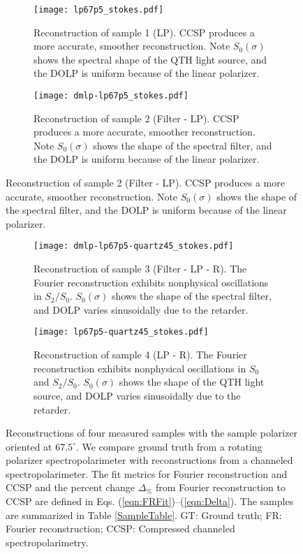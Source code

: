 \documentclass[10pt]{article}
\numberwithin{equation}{subsection}
\begin{document}
\begin{figure}[!tbh]
  \begin{subfigure}[b]{0.5\linewidth}
    \centering
    \texttt{[image: lp67p5\_stokes.pdf]}
      \caption{Reconstruction of sample 1 (LP). CCSP produces a more accurate, smoother reconstruction. Note $S_0(\sigma)$ shows the spectral shape of the QTH light source, and the DOLP is uniform because of the linear polarizer.}
    \label{fig:stokes1}
    \vspace{4ex}
  \end{subfigure}%
  \begin{subfigure}[b]{0.5\linewidth}
    \centering
    \texttt{[image: dmlp-lp67p5\_stokes.pdf]}
      \caption{Reconstruction of sample 2 (Filter - LP). CCSP produces a more accurate, smoother reconstruction. Note $S_0(\sigma)$ shows the shape of the spectral filter, and the DOLP is uniform because of the linear polarizer.}
    \label{fig:stokes2}
    \vspace{4ex}
  \end{subfigure}
\end{figure}
\begin{figure}[!bth]\ContinuedFloat
  \begin{subfigure}[b]{0.5\linewidth}
    \centering
    \texttt{[image: dmlp-lp67p5-quartz45\_stokes.pdf]}
    \caption{Reconstruction of sample 3 (Filter - LP - R). The Fourier reconstruction exhibits nonphysical oscillations in $S_2 / S_0$. $S_0(\sigma)$ shows the shape of the spectral filter, and DOLP varies sinusoidally due to the retarder.}
    \label{fig:stokes3}
  \end{subfigure}%
  \begin{subfigure}[b]{0.5\linewidth}
    \centering
    \texttt{[image: lp67p5-quartz45\_stokes.pdf]}
      \caption{Reconstruction of sample 4 (LP - R).
      The Fourier reconstruction exhibits nonphysical oscillations in $S_0$ and $S_2 / S_0$.
      $S_0(\sigma)$ shows the shape of the QTH light source, and DOLP varies sinusoidally due to the retarder.}
    \label{fig:stokes4}
  \end{subfigure}
    \caption{Reconstructions of four measured samples with the sample polarizer oriented at $67.5^\circ$.
           We compare ground truth from a rotating polarizer spectropolarimeter with reconstructions from a channeled spectropolarimeter.
        The fit metrics for Fourier reconstruction and CCSP and the percent change $\Delta_\%$ from Fourier reconstruction to CCSP are defined in Eqs. (\ref{eqn:FRFit})--(\ref{eqn:Delta}).
      The samples are summarized in Table \ref{SampleTable}.
      GT: Ground truth; FR: Fourier reconstruction; CCSP: Compressed channeled spectropolarimetry.}
  \label{fig:stokes}
\end{figure}
\end{document}
